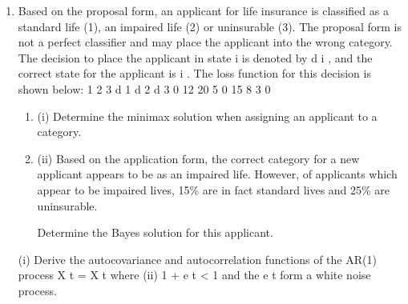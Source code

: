 \documentclass[a4paper,12pt]{article}
\begin{document}
\begin{enumerate}
\item Based on the proposal form, an applicant for life insurance is classified as a standard life (1), an impaired life (2) or uninsurable (3). The proposal form is not a perfect classifier and may place the applicant into the wrong category.
The decision to place the applicant in state i is denoted by d i , and the correct state for the applicant is i .
The loss function for this decision is shown below:
1
2
3
d 1 d 2 d 3
0
12
20 5
0
15 8
3
0

\begin{enumerate}
\item (i) Determine the minimax solution when assigning an applicant to a category. 
\item (ii) Based on the application form, the correct category for a new applicant appears to be as an impaired life. However, of applicants which appear to be impaired lives, 15\% are in fact standard lives and 25\% are uninsurable.

Determine the Bayes solution for this applicant.
\end{enumerate}%
(i)
Derive the autocovariance and autocorrelation functions of the AR(1) process
X t = X t
where
(ii)
1
+ e t
< 1 and the e t form a white noise process.


\end{enumerate}
\end{document}
